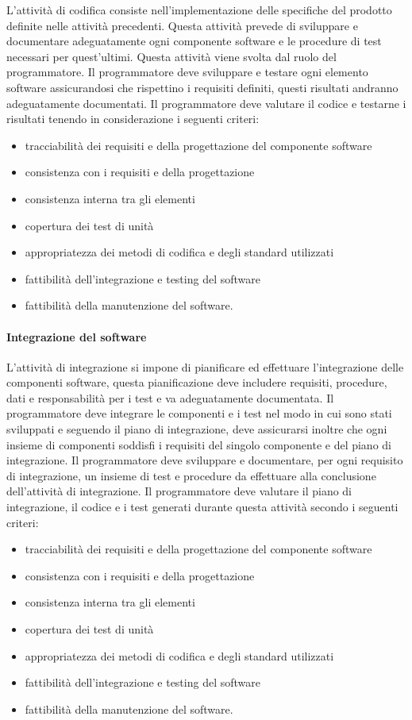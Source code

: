 \documentclass[../../norme-di-progetto.tex]{subfiles}
\begin{document}
L'attività di codifica consiste nell'implementazione delle specifiche del prodotto definite nelle attività precedenti.
Questa attività prevede di sviluppare e documentare adeguatamente ogni componente software e le procedure di test necessari per quest'ultimi.
Questa attività viene svolta dal ruolo del programmatore.
Il programmatore deve sviluppare e testare ogni elemento software assicurandosi che rispettino i requisiti definiti, questi risultati andranno adeguatamente documentati.
Il programmatore deve valutare il codice e testarne i risultati tenendo in considerazione i seguenti criteri:
\begin{itemize}
  \item tracciabilità dei requisiti e della progettazione del componente software
  \item consistenza con i requisiti e della progettazione
  \item consistenza interna tra gli elementi
  \item copertura dei test di unità
  \item appropriatezza dei metodi di codifica e degli standard utilizzati
  \item fattibilità dell'integrazione e testing del software
  \item fattibilità della manutenzione del software.
\end{itemize}

\paragraph{Integrazione del software}%
\label{par:integrazione_software}
L'attività di integrazione si impone di pianificare ed effettuare l'integrazione delle componenti software, questa pianificazione deve includere requisiti, procedure, dati e responsabilità per i test e va adeguatamente documentata.
Il programmatore deve integrare le componenti e i test nel modo in cui sono stati sviluppati e seguendo il piano di integrazione, deve assicurarsi inoltre che ogni insieme di componenti soddisfi i requisiti del singolo componente e del piano di integrazione.
Il programmatore deve sviluppare e documentare, per ogni requisito di integrazione, un insieme di test e procedure da effettuare alla conclusione dell'attività di integrazione.
Il programmatore deve valutare il piano di integrazione, il codice e i test generati durante questa attività secondo i seguenti criteri:
\begin{itemize}
  \item tracciabilità dei requisiti e della progettazione del componente software
  \item consistenza con i requisiti e della progettazione
  \item consistenza interna tra gli elementi
  \item copertura dei test di unità
  \item appropriatezza dei metodi di codifica e degli standard utilizzati
  \item fattibilità dell'integrazione e testing del software
  \item fattibilità della manutenzione del software.
\end{itemize}
\end{document}
